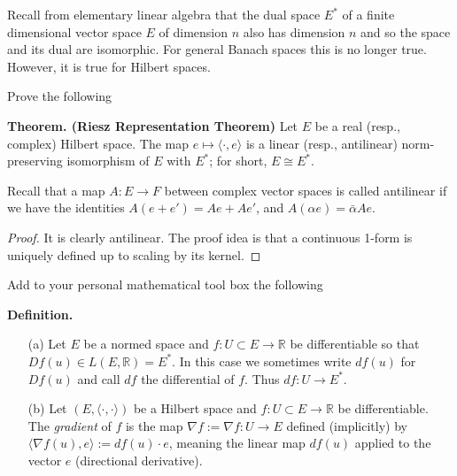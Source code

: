 \begin{Problem}
	Recall from elementary linear algebra that the dual space $E^*$ of a finite dimensional vector space $E$ of dimension $n$ also has dimension $n$ and so the space and its dual are isomorphic. For general Banach spaces this is no longer true. However, it is true for Hilbert spaces.
	
	Prove the following 
	
	\textbf{Theorem. (Riesz Representation Theorem)} Let $E$ be a real (resp., complex) Hilbert space. The map $e \mapsto \langle \cdot, e \rangle$ is a linear (resp., antilinear) norm-preserving isomorphism of $E$ with $E^*$; for short, $E \cong E^*$.
	
	Recall that a map $A : E \to F$ between complex vector spaces is called antilinear if we have the identities $A(e + e') = Ae + Ae'$, and $A(\alpha e) = \bar{\alpha} Ae$.
\end{Problem}
\begin{proof}
	It is clearly antilinear. The proof idea is that a continuous 1-form is uniquely defined up to scaling by its kernel. 
\end{proof}
\begin{Problem}
	Add to your personal mathematical tool box the following
	
	\textbf{Definition.}
	\begin{itemize}
		\item[(a)] Let $E$ be a normed space and $f : U \subset E \to \mathbb{R}$ be differentiable so that $Df(u) \in L(E,\mathbb{R}) = E^*$. In this case we sometimes write $df(u)$ for $Df(u)$ and call $df$ the differential of $f$. Thus $df : U \to E^*$.
		
		\item[(b)] Let $(E, \langle \cdot,\cdot \rangle)$ be a Hilbert space and $f : U \subset E \to \mathbb{R}$ be differentiable. The \textit{gradient} of $f$ is the map $\nabla f := \nabla f : U \to E$ defined (implicitly) by $\langle \nabla f(u), e \rangle := df(u) \cdot e$, meaning the linear map $df(u)$ applied to the vector $e$ (directional derivative).
	\end{itemize}
\end{Problem}
